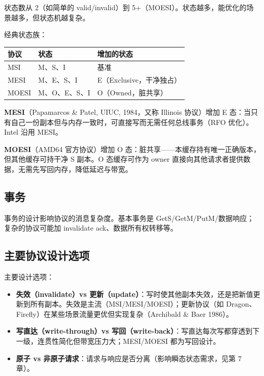状态数从 2（如简单的 valid/invalid）到 5+（MOESI）。状态越多，能优化的场景越多，但状态机越复杂。

经典状态族：

\begin{center}
\begin{tabular}{lll}
\toprule
协议 & 状态 & 增加的状态 \\
\midrule
MSI & M、S、I & 基准 \\
MESI & M、E、S、I & E（Exclusive，干净独占） \\
MOESI & M、O、E、S、I & O（Owned，脏共享） \\
\bottomrule
\end{tabular}
\end{center}


\textbf{MESI}（Papamarcos \& Patel, UIUC, 1984，又称 Illinois 协议）增加 E 态：当只有自己一份副本但与内存一致时，可直接写而无需任何总线事务（RFO 优化）。Intel 沿用 MESI。

\textbf{MOESI}（AMD64 官方协议）增加 O 态：脏共享——本缓存持有唯一正确版本，但其他缓存可持干净 S 副本。O 态缓存可作为 owner 直接向其他请求者提供数据，无需先写回内存，降低延迟与带宽。

\subsection{事务}

事务的设计影响协议的消息复杂度。基本事务是 GetS/GetM/PutM/数据响应；复杂的协议可能加 invalidate ack、数据所有权转移等。

\subsection{主要协议设计选项}

主要设计选项：

\begin{itemize}
\item \textbf{失效（invalidate）vs 更新（update）}：写时使其他副本失效，还是把新值更新到所有副本。失效是主流（MSI/MESI/MOESI）；更新协议（如 Dragon、Firefly）在某些场景流量更优但实现复杂（Archibald \& Baer 1986）。
\item \textbf{写直达（write-through）vs 写回（write-back）}：写直达每次写都穿透到下一级，连贯性简化但带宽压力大；MESI/MOESI 都为写回设计。
\item \textbf{原子 vs 非原子请求}：请求与响应是否分离（影响瞬态状态需求，见第 7 章）。
\end{itemize}


